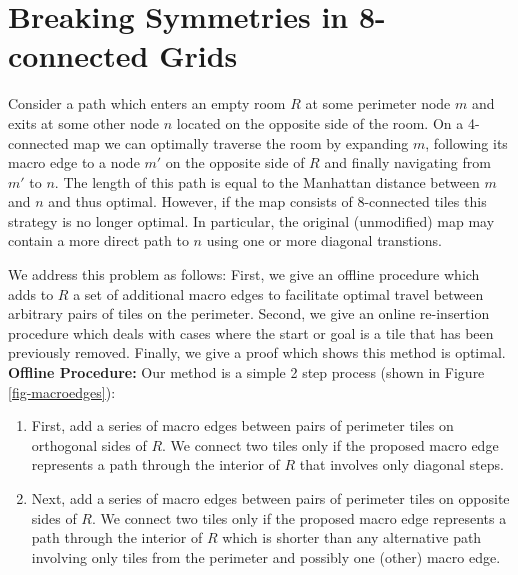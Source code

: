 \section{Breaking Symmetries in 8-connected Grids}


Consider a path which enters an empty room $R$ at some perimeter node $m$ and exits at some other
node $n$ located on the opposite side of the room.
On a 4-connected map we can optimally traverse the room by expanding $m$, following
its macro edge to a node $m'$ on the opposite side of $R$ and finally navigating from $m'$ to $n$.
The length of this path is equal to the Manhattan distance between $m$ and $n$ and thus optimal.
However, if the map consists of 8-connected tiles this strategy is no longer optimal.
In particular, the original (unmodified) map may contain a more direct path to $n$ using one or more diagonal
transtions.
\par
We address this problem as follows:
First, we give an offline procedure which adds to $R$ a set of additional macro edges
to facilitate optimal travel between arbitrary pairs of tiles on the perimeter.
Second, we give an online re-insertion procedure which deals with cases where the start or
goal is a tile that has been previously removed.
Finally, we give a proof which shows this method is optimal.
\\ \newline
\textbf{Offline Procedure: }
Our method is a simple 2 step process (shown in Figure \ref{fig-macroedges}):

\begin{enumerate}
\item{First, add a series of macro edges between pairs of perimeter tiles on orthogonal sides of $R$. 
We connect two tiles only if the proposed macro edge represents a path through the interior of $R$ that involves
only diagonal steps. }
\item{Next, add a series of macro edges between pairs of perimeter tiles on opposite sides of $R$.
We connect two tiles only if the proposed macro edge represents a path through the interior of $R$ which is shorter
than any alternative path involving only tiles from the perimeter and possibly one (other) macro edge.
}
\end{enumerate}


